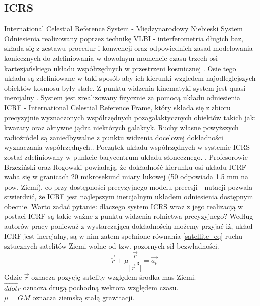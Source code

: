 	\subsection{ICRS}
International Celestial Reference System - Międzynarodowy Niebieski System Odniesienia realizowany poprzez technikę VLBI - interferometria długich baz, 
składa się z zestawu procedur i konwencji oraz odpowiednich zasad modelowania koniecznych do zdefiniowania w dowolnym momencie czasu trzech osi kartezjańskiego 
układu współrzędnych w przestrzeni kosmicznej \cite{IERS_ICRS}. Osie tego układu są zdefiniowane w taki sposób aby ich kierunki wzgledem najodleglejszych obiektów 
kosmosu były stałe. Z punktu widzenia kinematyki system jest quasi-inercjalny \cite[][strona 23]{KRYNSKI_SYSTEMY}.
System jest zrealizowany fizycznie za pomocą układu odniesienia ICRF - International Celestial Reference Frame, który składa się z zbioru precyzyjnie
wyznaczonych współrzędnych pozagalaktycznych obiektów takich jak: kwazary oraz aktywne jądra niektórych galaktyk.
Ruchy własne powyższych radioźródeł są zaniedbywalne z punktu widzenia docelowej dokładności wyznaczania współrzędnych.\cite[][strona 21]{IERS_2010}.
Początek układu współrzędnych w systemie ICRS został zdefiniowany w punkcie barycentrum układu słonecznego. \cite[][strona 163]{BRZEZINSKI_2012}.
Profesorowie Brzeziński oraz Rogowski powiadają, że dokładność kierunku osi układu ICRF waha się w granicach 20 mikrosekund miary łukowej
(50 odpowiada 1.5 mm na pow. Ziemi), co przy dostępności 
precyzyjnego modelu precesji - nutacji pozwala stwierdzić, że ICRF jest najlepszym inercjalnym układem odniesienia dostępnym obecnie\cite[][strona 164]{BRZEZINSKI_2012}.
Warto zadać pytanie: dlaczego system ICRS wraz z jego realizacją w postaci ICRF są takie ważne z punktu widzenia rolnictwa precyzyjnego?
Według autorów pracy \cite[][strona 164]{BRZEZINSKI_2012} ponieważ z wystarczającą dokładnością możemy przyjać iż, układ ICRF jest inercjalny, 
są w nim zatem spełnione równania \ref{satellite_eq} ruchu sztucznych satelitów Ziemi wolne od tzw. pozornych sił bezwładności.
\begin{equation} \label{satellite_eq}
\quad \vec{ \ddot{r} } + \mu \frac{ \vec{r} } { \lvert { \vec{r} }^{\,3} \rvert } = \vec{a_p}
\end{equation} 
Gdzie $ \vec{r} $ oznacza pozycję satelity względem środka mas Ziemi.\\
$\vec{ddot{r}}$ oznacza drugą pochodną wektora względem czasu.\\
$\mu = GM $ oznacza ziemską stałą grawitacji.\\
